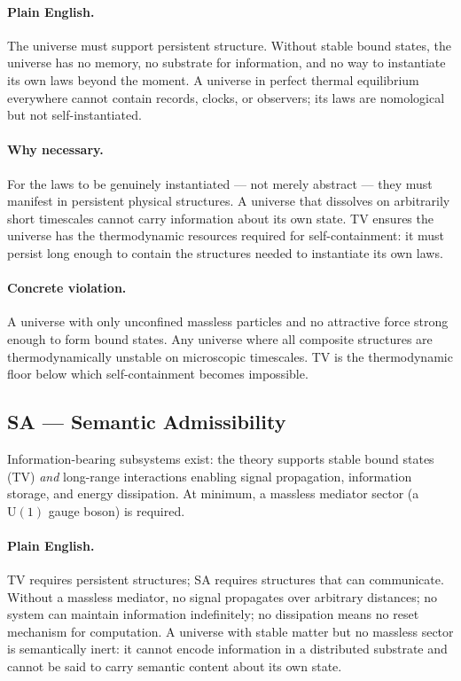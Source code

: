 \documentclass[11pt,openany]{book}
\theoremstyle{remark}
\begin{document}
\paragraph{Plain English.}
The universe must support persistent structure. Without stable bound states, the
universe has no memory, no substrate for information, and no way to instantiate its
own laws beyond the moment. A universe in perfect thermal equilibrium everywhere
cannot contain records, clocks, or observers; its laws are nomological but not
self-instantiated.

\paragraph{Why necessary.}
For the laws to be genuinely instantiated --- not merely abstract --- they must
manifest in persistent physical structures. A universe that dissolves on arbitrarily
short timescales cannot carry information about its own state. TV ensures the universe
has the thermodynamic resources required for self-containment: it must persist long
enough to contain the structures needed to instantiate its own laws.

\paragraph{Concrete violation.}
A universe with only unconfined massless particles and no attractive force strong
enough to form bound states. Any universe where all composite structures are
thermodynamically unstable on microscopic timescales. TV is the thermodynamic floor
below which self-containment becomes impossible.

\subsection*{SA --- Semantic Admissibility}

\begin{tcolorbox}[colback=green!5,colframe=green!50!black,
  title={Definition: SA --- Semantic Admissibility}]
Information-bearing subsystems exist: the theory supports stable bound states (TV)
\emph{and} long-range interactions enabling signal propagation, information storage,
and energy dissipation. At minimum, a massless mediator sector (a $\mathrm{U}(1)$
gauge boson) is required.
\end{tcolorbox}

\paragraph{Plain English.}
TV requires persistent structures; SA requires structures that can communicate.
Without a massless mediator, no signal propagates over arbitrary distances; no system
can maintain information indefinitely; no dissipation means no reset mechanism for
computation. A universe with stable matter but no massless sector is semantically
inert: it cannot encode information in a distributed substrate and cannot be said
to carry semantic content about its own state.
\end{document}
